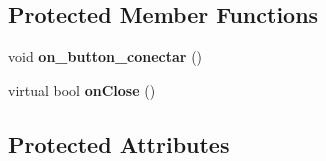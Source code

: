 \subsection*{Protected Member Functions}
\begin{DoxyCompactItemize}
\item 
\hypertarget{classIpwindow_ac8036a10cc5b5f42086291c44a29e7f5}{void {\bfseries on\-\_\-button\-\_\-conectar} ()}\label{classIpwindow_ac8036a10cc5b5f42086291c44a29e7f5}

\item 
\hypertarget{classIpwindow_a8edefd3ac4bdaefeac7bb164e6dba8f1}{virtual bool {\bfseries on\-Close} ()}\label{classIpwindow_a8edefd3ac4bdaefeac7bb164e6dba8f1}

\end{DoxyCompactItemize}
\subsection*{Protected Attributes}
